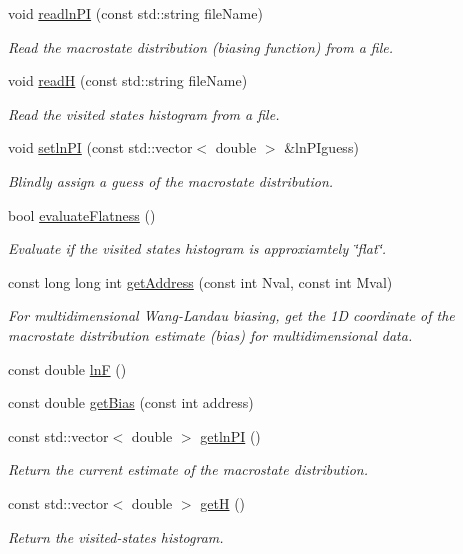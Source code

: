 \begin{DoxyCompactItemize}
void \hyperlink{classwala_ae04916f49c11b0636e813787a3906570}{readln\-P\-I} (const std\-::string file\-Name)
\begin{DoxyCompactList}\small\item\em Read the macrostate distribution (biasing function) from a file. \end{DoxyCompactList}\item 
void \hyperlink{classwala_a0b8df0fb2b7722fc4a458e527a478b6f}{read\-H} (const std\-::string file\-Name)
\begin{DoxyCompactList}\small\item\em Read the visited states histogram from a file. \end{DoxyCompactList}\item 
void \hyperlink{classwala_a1d778061b12611b1a35eb3ca15038d02}{setln\-P\-I} (const std\-::vector$<$ double $>$ \&ln\-P\-Iguess)
\begin{DoxyCompactList}\small\item\em Blindly assign a guess of the macrostate distribution. \end{DoxyCompactList}\item 
bool \hyperlink{classwala_add6302db96fcc45811b2944de2936525}{evaluate\-Flatness} ()
\begin{DoxyCompactList}\small\item\em Evaluate if the visited states histogram is approxiamtely \char`\"{}flat\char`\"{}. \end{DoxyCompactList}\item 
const long long int \hyperlink{classwala_a85b637b892b3c24cb252397433cbfad0}{get\-Address} (const int Nval, const int Mval)
\begin{DoxyCompactList}\small\item\em For multidimensional Wang-\/\-Landau biasing, get the 1\-D coordinate of the macrostate distribution estimate (bias) for multidimensional data. \end{DoxyCompactList}\item 
const double \hyperlink{classwala_acb8e59580d97bc3c5b9b4ff45eb6bb9a}{ln\-F} ()
\item 
const double \hyperlink{classwala_a03f7b333aa0a280e78060bd9af7ec318}{get\-Bias} (const int address)
\item 
const std\-::vector$<$ double $>$ \hyperlink{classwala_a80b00e34135eb6da4e81cd0935622fc5}{getln\-P\-I} ()
\begin{DoxyCompactList}\small\item\em Return the current estimate of the macrostate distribution. \end{DoxyCompactList}\item 
const std\-::vector$<$ double $>$ \hyperlink{classwala_a52cec7bdf93eec7d4eefc627b71f1f65}{get\-H} ()
\begin{DoxyCompactList}\small\item\em Return the visited-\/states histogram. \end{DoxyCompactList}\end{DoxyCompactItemize}


